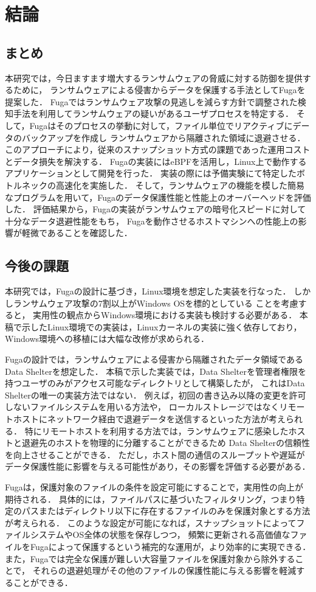 \chapter{結論}
\label{chap:conclusion}
\section{まとめ}
本研究では，今日ますます増大するランサムウェアの脅威に対する防御を提供するために，
ランサムウェアによる侵害からデータを保護する手法としてFugaを提案した．
Fugaではランサムウェア攻撃の見逃しを減らす方針で調整された検知手法を利用してランサムウェアの疑いがあるユーザプロセスを特定する．
そして，Fugaはそのプロセスの挙動に対して，ファイル単位でリアクティブにデータのバックアップを作成し
ランサムウェアから隔離された領域に退避させる．
このアプローチにより，従来のスナップショット方式の課題であった運用コストとデータ損失を解決する．
Fugaの実装にはeBPFを活用し，Linux上で動作するアプリケーションとして開発を行った．
実装の際には予備実験にて特定したボトルネックの高速化を実施した．
そして，ランサムウェアの機能を模した簡易なプログラムを用いて，Fugaのデータ保護性能と性能上のオーバーヘッドを評価した．
評価結果から，Fugaの実装がランサムウェアの暗号化スピードに対して十分なデータ退避性能をもち，
Fugaを動作させるホストマシンへの性能上の影響が軽微であることを確認した．

\section{今後の課題}
本研究では，Fugaの設計に基づき，Linux環境を想定した実装を行なった．
しかしランサムウェア攻撃の7割以上がWindows OSを標的としている \cite{trendmicro-report} ことを考慮すると，
実用性の観点からWindows環境における実装も検討する必要がある．
本稿で示したLinux環境での実装は，Linuxカーネルの実装に強く依存しており，
Windows環境への移植には大幅な改修が求められる．

Fugaの設計では，ランサムウェアによる侵害から隔離されたデータ領域であるData Shelterを想定した．
本稿で示した実装では，Data Shelterを管理者権限を持つユーザのみがアクセス可能なディレクトリとして構築したが，
これはData Shelterの唯一の実装方法ではない．
例えば，初回の書き込み以降の変更を許可しないファイルシステムを用いる方法や，
ローカルストレージではなくリモートホストにネットワーク経由で退避データを送信するといった方法が考えられる．
特にリモートホストを利用する方法では，ランサムウェアに感染したホストと退避先のホストを物理的に分離することができるため
Data Shelterの信頼性を向上させることができる．
ただし，ホスト間の通信のスループットや遅延がデータ保護性能に影響を与える可能性があり，その影響を評価する必要がある．

Fugaは，保護対象のファイルの条件を設定可能にすることで，実用性の向上が期待される．
具体的には，ファイルパスに基づいたフィルタリング，つまり特定のパスまたはディレクトリ以下に存在するファイルのみを保護対象とする方法が考えられる．
このような設定が可能になれば，スナップショットによってファイルシステムやOS全体の状態を保存しつつ，
頻繁に更新される高価値なファイルをFugaによって保護するという補完的な運用が，より効率的に実現できる．
また，Fugaでは完全な保護が難しい大容量ファイルを保護対象から除外することで，
それらの退避処理がその他のファイルの保護性能に与える影響を軽減することができる．
